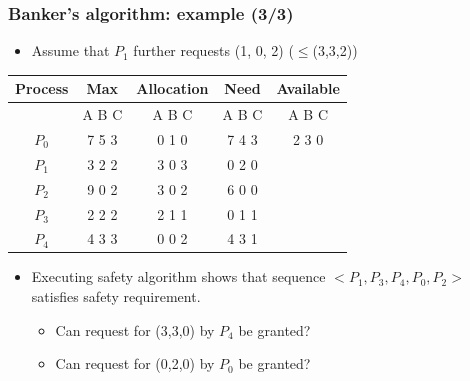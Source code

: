 \documentclass[CJKutf8,xcolor=pdftex,dvipsnames,table]{beamer}
\begin{document}
\begin{CJK*}{UTF8}{song}
  \begin{frame}
  \frametitle{Banker's algorithm: example (3/3)} \pause
  \begin{itemize}
  \item{Assume that $P_1$ further requests (1, 0, 2) ($\leq$(3,3,2))} \pause
  \end{itemize}
  \begin{tabular}{ccccc}
    Process & Max   & Allocation & Need  & Available\\
    \hline
            & A B C & A B C      & A B C & A B C\\
    $P_0$   & 7 5 3 & 0 1 0      & 7 4 3 & 2 3 0\\
    $P_1$   & 3 2 2 & 3 0 3      & 0 2 0 &      \\
    $P_2$   & 9 0 2 & 3 0 2      & 6 0 0 &      \\
    $P_3$   & 2 2 2 & 2 1 1      & 0 1 1 &      \\
    $P_4$   & 4 3 3 & 0 0 2      & 4 3 1 &      \\
  \end{tabular} \pause
  \begin{itemize}
  \item{Executing safety algorithm shows that sequence $<P_1, P_3, P_4, P_0, P_2>$ satisfies safety requirement.} \pause
    \begin{itemize}
    \item{Can request for (3,3,0) by $P_4$ be granted?} \pause
    \item{Can request for (0,2,0) by $P_0$ be granted?}
    \end{itemize}
  \end{itemize}
  \end{frame}
  

\end{CJK*}
\end{document}
